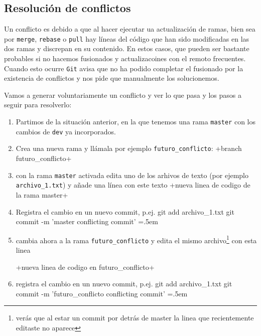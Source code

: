 \documentclass[a5paper, oneside,10pt]{article}
\newenvironment{cverbatim}
 {\SaveVerbatim{cverb}}
 {\endSaveVerbatim
  \flushleft\fboxrule=0pt\fboxsep=.5em
  \colorbox{bg}{\BUseVerbatim{cverb}}%
  \endflushleft
}
\begin{document}
  \subsection{Resolución de conflictos}
    Un conflicto es debido a que al hacer ejecutar ua actualización de ramas, bien sea por \verb+merge+, \verb+rebase+ o \verb+pull+ hay líneas del código que han sido modificadas en las dos ramas y discrepan en su contenido. En estos casos, que pueden ser bastante probables si no hacemos fusionados y actualizacoines con el remoto frecuentes. Cuando esto ocurre \verb+Git+ avisa que no ha podido completar el fusionado por la existencia de conflictos y nos pide que manualmente los solucionemos.
    
    Vamos a generar voluntariamente un conflicto y ver lo que pasa y los pasos a seguir para resolverlo:
    \begin{enumerate}
     \item Partimos de la situación anterior, en la que tenemos una rama \verb+master+ con los cambios de \verb+dev+ ya incorporados.
     
     \item Crea una nueva rama y llámala por ejemplo \verb+futuro_conflicto+:
     \cverb+branch futuro_conflicto+
     
     \item con la rama \verb+master+ activada edita uno de los arhivos de texto (por ejemplo \verb+archivo_1.txt+) y añade una línea con este texto
     \cverb+nueva linea de codigo de la rama master+
     
     \item Registra el cambio en un nuevo commit, p.ej.
     \begin{cverbatim}
git add archivo_1.txt
git commit -m 'master conflicting commit'
     \end{cverbatim}

     \item cambia ahora a la rama \verb+futuro_conflicto+ y edita el mismo archivo\footnote{verás que al estar un commit por detrás de master la linea que recientemente editaste no aparece} con esta linea
     
     \cverb+nueva linea de codigo en futuro_conflicto+
     
     \item registra el cambio en un nuevo commit, p.ej.
     \begin{cverbatim}
git add archivo_1.txt
git commit -m 'futuro_conflicto conflicting commit'
     \end{cverbatim}
     

\end{enumerate}
\end{document}

